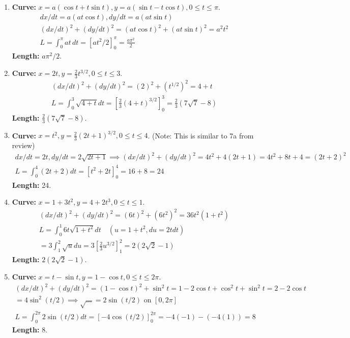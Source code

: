 \documentclass[12pt]{article}
\begin{document}
\begin{enumerate}
    \item \textbf{Curve:} $x=a(\cos t+t\sin t), y=a(\sin t-t\cos t), 0 \le t \le \pi$.
    \begin{align*}
        dx/dt = a(at\cos t), dy/dt = a(at\sin t) \\
        (dx/dt)^2+(dy/dt)^2 = (at\cos t)^2+(at\sin t)^2 = a^2t^2 \\
        L = \int_0^\pi at \,dt = [a t^2/2]_0^\pi = \frac{a\pi^2}{2}
    \end{align*}
    \textbf{Length:} $a\pi^2/2$.

    \item \textbf{Curve:} $x = 2t, y = \frac{2}{3}t^{3/2}, 0 \le t \le 3$.
    \begin{align*}
        (dx/dt)^2+(dy/dt)^2 = (2)^2+(t^{1/2})^2 = 4+t \\
        L = \int_0^3 \sqrt{4+t} dt = [\frac{2}{3}(4+t)^{3/2}]_0^3 = \frac{2}{3}(7\sqrt{7}-8)
    \end{align*}
    \textbf{Length:} $\frac{2}{3}(7\sqrt{7}-8)$.

    \item \textbf{Curve:} $x=t^2, y=\frac{2}{3}(2t+1)^{3/2}, 0 \le t \le 4$. (Note: This is similar to 7a from review)
    \begin{align*}
        dx/dt = 2t, dy/dt = 2\sqrt{2t+1} \implies (dx/dt)^2+(dy/dt)^2 = 4t^2+4(2t+1) = 4t^2+8t+4 = (2t+2)^2 \\
        L = \int_0^4 (2t+2) dt = [t^2+2t]_0^4 = 16+8=24
    \end{align*}
    \textbf{Length:} 24.

    \item \textbf{Curve:} $x=1+3t^2, y=4+2t^3, 0 \le t \le 1$.
    \begin{align*}
        (dx/dt)^2+(dy/dt)^2 = (6t)^2+(6t^2)^2 = 36t^2(1+t^2) \\
        L = \int_0^1 6t\sqrt{1+t^2} dt \quad (u=1+t^2, du=2tdt) \\
        = 3\int_1^2 \sqrt{u}du = 3[\frac{2}{3}u^{3/2}]_1^2 = 2(2\sqrt{2}-1)
    \end{align*}
    \textbf{Length:} $2(2\sqrt{2}-1)$.
    
    \item \textbf{Curve:} $x=t-\sin t, y=1-\cos t, 0 \le t \le 2\pi$.
    \begin{align*}
        (dx/dt)^2+(dy/dt)^2 = (1-\cos t)^2+\sin^2 t = 1-2\cos t+\cos^2 t+\sin^2 t = 2-2\cos t \\
        = 4\sin^2(t/2) \implies \sqrt{\dots} = 2\sin(t/2) \text{ on } [0, 2\pi] \\
        L = \int_0^{2\pi} 2\sin(t/2) dt = [-4\cos(t/2)]_0^{2\pi} = -4(-1) - (-4(1)) = 8
    \end{align*}
    \textbf{Length:} 8.


\end{enumerate}
\end{document}
